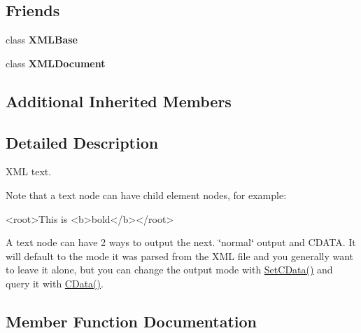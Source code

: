 \subsection*{Friends}
\begin{DoxyCompactItemize}
\item 
\hypertarget{classtinyxml2_1_1_x_m_l_text_a449202cfc89e7ae5c2f81995476f9ec1}{}class {\bfseries X\+M\+L\+Base}\label{classtinyxml2_1_1_x_m_l_text_a449202cfc89e7ae5c2f81995476f9ec1}

\item 
\hypertarget{classtinyxml2_1_1_x_m_l_text_a4eee3bda60c60a30e4e8cd4ea91c4c6e}{}class {\bfseries X\+M\+L\+Document}\label{classtinyxml2_1_1_x_m_l_text_a4eee3bda60c60a30e4e8cd4ea91c4c6e}

\end{DoxyCompactItemize}
\subsection*{Additional Inherited Members}


\subsection{Detailed Description}
X\+M\+L text.

Note that a text node can have child element nodes, for example\+: \begin{DoxyVerb}<root>This is <b>bold</b></root>
\end{DoxyVerb}


A text node can have 2 ways to output the next. \char`\"{}normal\char`\"{} output and C\+D\+A\+T\+A. It will default to the mode it was parsed from the X\+M\+L file and you generally want to leave it alone, but you can change the output mode with \hyperlink{classtinyxml2_1_1_x_m_l_text_ad080357d76ab7cc59d7651249949329d}{Set\+C\+Data()} and query it with \hyperlink{classtinyxml2_1_1_x_m_l_text_a125574fe49da80efbae1349f20d02d41}{C\+Data()}. 

\subsection{Member Function Documentation}
\hypertarget{classtinyxml2_1_1_x_m_l_text_a5182333a5bad80566a0c6e475e828d1d}{}
